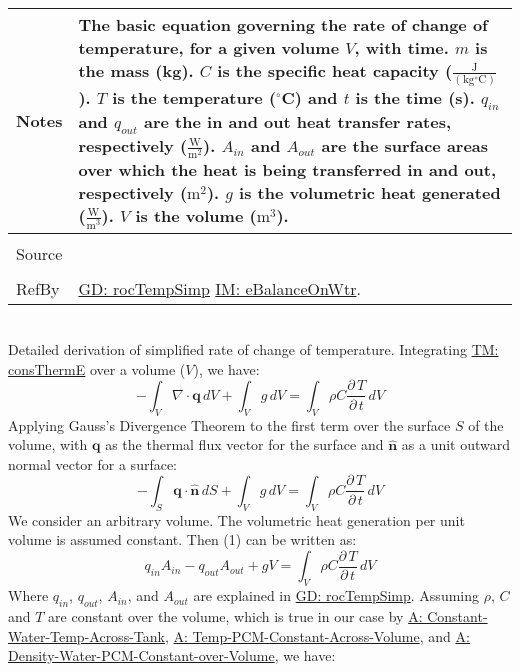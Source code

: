 \documentclass[12pt]{article}
\begin{document}
\begin{minipage}{\textwidth}
\begin{tabular}{p{} p{}}
                                 Notes & The basic equation governing the rate of change of temperature, for a given volume $V$, with time. $m$ is the mass (kg). $C$ is the specific heat capacity ($\frac{\text{J}}{(\text{kg}{}^{\circ}\text{C})}$). $T$ is the temperature (${}^{\circ}$C) and $t$ is the time (s). ${q_{in}}$ and ${q_{out}}$ are the in and out heat transfer rates, respectively ($\frac{\text{W}}{\text{m}^{2}}$). ${A_{in}}$ and ${A_{out}}$ are the surface areas over which the heat is being transferred in and out, respectively ($\text{m}^{2}$). $g$ is the volumetric heat generated ($\frac{\text{W}}{\text{m}^{3}}$). $V$ is the volume ($\text{m}^{3}$).
                                         \\ \midrule \\
                                         Source & \\ \midrule \\
                                                  RefBy & \hyperref[GD:rocTempSimp]{GD: rocTempSimp} \hyperref[IM:eBalanceOnWtr]{IM: eBalanceOnWtr}.
\\ \bottomrule \end{tabular}
\end{minipage}\\
Detailed derivation of simplified rate of change of temperature.
Integrating \hyperref[TM:consThermE]{TM: consThermE} over a volume ($V$), we have:
\begin{displaymath}
-\int_{V}{∇\cdot{}\mathbf{q}}\,dV+\int_{V}{g}\,dV=\int_{V}{ρ C \frac{\partial{}\,T}{\partial{}\,t}}\,dV
\end{displaymath}
Applying Gauss's Divergence Theorem to the first term over the surface $S$ of the volume, with $\mathbf{q}$ as the thermal flux vector for the surface and $\mathbf{\hat{n}}$ as a unit outward normal vector for a surface:
\begin{displaymath}
-\int_{S}{\mathbf{q}\cdot{}\mathbf{\hat{n}}}\,dS+\int_{V}{g}\,dV=\int_{V}{ρ C \frac{\partial{}\,T}{\partial{}\,t}}\,dV
\end{displaymath}
We consider an arbitrary volume. The volumetric heat generation per unit volume is assumed constant. Then (1) can be written as:
\begin{displaymath}
{q_{in}} {A_{in}}-{q_{out}} {A_{out}}+g V=\int_{V}{ρ C \frac{\partial{}\,T}{\partial{}\,t}}\,dV
\end{displaymath}
Where ${q_{in}}$, ${q_{out}}$, ${A_{in}}$, and ${A_{out}}$ are explained in \hyperref[GD:rocTempSimp]{GD: rocTempSimp}. Assuming $ρ$, $C$ and $T$ are constant over the volume, which is true in our case by \hyperref[A:Constant-Water-Temp-Across-Tank]{A: Constant-Water-Temp-Across-Tank}, \hyperref[A:Temp-PCM-Constant-Across-Volume]{A: Temp-PCM-Constant-Across-Volume}, and \hyperref[A:Density-Water-PCM-Constant-over-Volume]{A: Density-Water-PCM-Constant-over-Volume}, we have:
\end{document}
